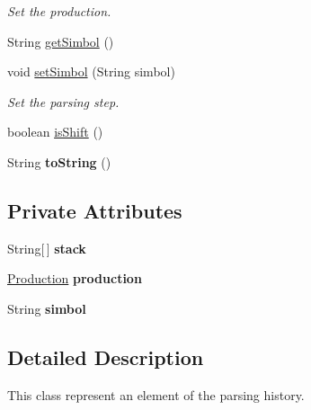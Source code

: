\begin{DoxyCompactItemize}
\begin{DoxyCompactList}\small\item\em Set the production. \end{DoxyCompactList}\item 
String \hyperlink{classparser_program_1_1_history_element_ab64610fe65f58bca7d542244378ac030}{get\-Simbol} ()
\item 
void \hyperlink{classparser_program_1_1_history_element_a54ecd254d7abd49d0d10230892dfc35b}{set\-Simbol} (String simbol)
\begin{DoxyCompactList}\small\item\em Set the parsing step. \end{DoxyCompactList}\item 
boolean \hyperlink{classparser_program_1_1_history_element_a233c9c55643f4d6bc8103c4e2c8bd038}{is\-Shift} ()
\item 
\hypertarget{classparser_program_1_1_history_element_aa0ddd25dd8d27e59d63123b2f50e1cb4}{String {\bfseries to\-String} ()}\label{classparser_program_1_1_history_element_aa0ddd25dd8d27e59d63123b2f50e1cb4}

\end{DoxyCompactItemize}
\subsection*{Private Attributes}
\begin{DoxyCompactItemize}
\item 
\hypertarget{classparser_program_1_1_history_element_a3ab04c9be50cda70dcfd9ee134884d9f}{String\mbox{[}$\,$\mbox{]} {\bfseries stack}}\label{classparser_program_1_1_history_element_a3ab04c9be50cda70dcfd9ee134884d9f}

\item 
\hypertarget{classparser_program_1_1_history_element_a93323e030ba302f08564c7d6cd021a15}{\hyperlink{classcontext_free_1_1grammar_1_1_production}{Production} {\bfseries production}}\label{classparser_program_1_1_history_element_a93323e030ba302f08564c7d6cd021a15}

\item 
\hypertarget{classparser_program_1_1_history_element_a3c9ad24a6a0f33ac5d1cbc95ff1e82de}{String {\bfseries simbol}}\label{classparser_program_1_1_history_element_a3c9ad24a6a0f33ac5d1cbc95ff1e82de}

\end{DoxyCompactItemize}


\subsection{Detailed Description}
This class represent an element of the parsing history. 

